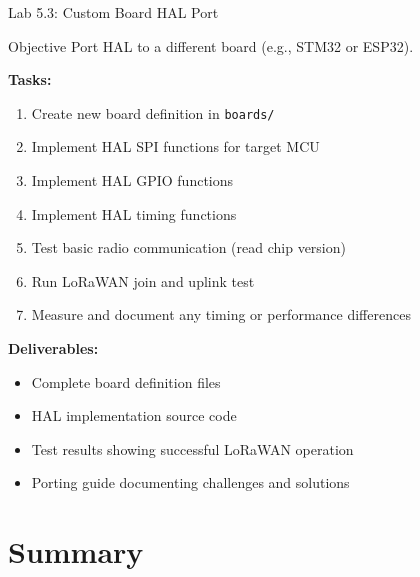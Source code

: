 \documentclass{beamer}
\begin{document}
\begin{frame}{Lab 5.3: Custom Board HAL Port}
\begin{block}{Objective}
Port HAL to a different board (e.g., STM32 or ESP32).
\end{block}

\textbf{Tasks:}
\begin{enumerate}
    \item Create new board definition in \texttt{boards/}
    \item Implement HAL SPI functions for target MCU
    \item Implement HAL GPIO functions
    \item Implement HAL timing functions
    \item Test basic radio communication (read chip version)
    \item Run LoRaWAN join and uplink test
    \item Measure and document any timing or performance differences
\end{enumerate}

\vspace{0.3cm}

\textbf{Deliverables:}
\begin{itemize}
    \item Complete board definition files
    \item HAL implementation source code
    \item Test results showing successful LoRaWAN operation
    \item Porting guide documenting challenges and solutions
\end{itemize}
\end{frame}

\section{Summary}
\end{document}
